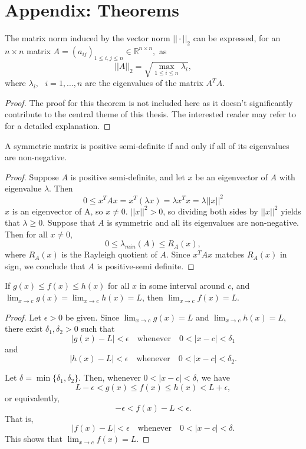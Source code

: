 \section{Appendix: Theorems}
\begin{theorem}\label{spectral norm}
\textnormal{\cite[3]{matrixnorms}}
The matrix norm induced by the vector norm $||\cdot||_{2}$ can be expressed, for an $n\times n$ matrix $A = (a_{ij})_{1\leq i,j \leq n} \in \mathbb{R}^{n\times n},$ as $$||A||_{2}=\sqrt{\underset{1 \leq i \leq n}{\max}\lambda_{i}},$$
where $\lambda_{i},\text{ }i=1,\ldots,n$ are the \textnormal{eigenvalues} of the matrix $A^{T}A.$
\end{theorem}
\begin{proof}
    The proof for this theorem is not included here as it doesn't significantly contribute to the central theme of this thesis. The interested reader may refer to \cite[4]{matrixnorms} for a detailed explanation.
\end{proof}
\begin{theorem}\label{SPD_e}
    A symmetric matrix is positive semi-definite if and only if all of its eigenvalues are non-negative. 
\end{theorem}
\begin{proof}
Suppose $A$ is positive semi-definite, and let $x$ be an eigenvector of $A$ with eigenvalue $\lambda.$ Then $$0\leq x^{T}Ax = x^{T}(\lambda x) = \lambda x^{T}x = \lambda ||x||^{2}$$
$x$ is an eigenvector of A, so $x\neq 0$. $||x||^{2}> 0$, so dividing both sides by $||x||^{2}$ yields that $\lambda \geq 0.$ Suppose that $A$ is symmetric and all its eigenvalues are non-negative. Then for all $x\neq 0,$
$$0\leq \lambda_{min}(A)\leq R_{A}(x),$$
where $R_{A}(x)$ is the Rayleigh quotient of $A.$ Since $x^{T}Ax$ matches $R_{A}(x)$ in sign, we conclude that $A$ is positive-semi definite.
\end{proof}
\begin{theorem}\label{squeeze_theorem}
    If $g(x) \leq f(x) \leq h(x)$ for all $x$ in some interval around $c$, and $\lim_{x\to c} g(x) = \lim_{x\to c} h(x) = L$, then $\lim_{x\to c} f(x) = L$.
\end{theorem}
\begin{proof}
Let $\epsilon > 0$ be given. Since $\lim_{x\to c} g(x) = L$ and $\lim_{x\to c} h(x) = L$, there exist $\delta_1, \delta_2 > 0$ such that 
\[
|g(x) - L| < \epsilon \quad \text{whenever} \quad 0 < |x - c| < \delta_1
\]
and
\[
|h(x) - L| < \epsilon \quad \text{whenever} \quad 0 < |x - c| < \delta_2.
\]

Let $\delta = \min\{\delta_1, \delta_2\}$. Then, whenever $0 < |x - c| < \delta$, we have
\[
L - \epsilon < g(x) \leq f(x) \leq h(x) < L + \epsilon,
\]
or equivalently,
\[
-\epsilon < f(x) - L < \epsilon.
\]
That is,
\[
|f(x) - L| < \epsilon \quad \text{whenever} \quad 0 < |x - c| < \delta.
\]
This shows that $\lim_{x\to c} f(x) = L$.
\end{proof}










